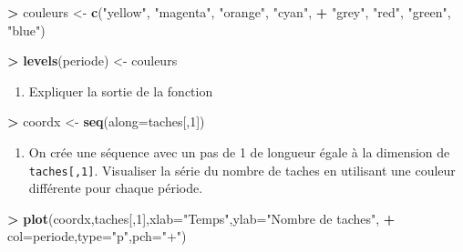 \documentclass[]{book}
\newenvironment{Shaded}{\begin{snugshade}}{\end{snugshade}}
\newcommand{\DataTypeTok}[1]{\textcolor[rgb]{0.13,0.29,0.53}{#1}}
\newcommand{\DecValTok}[1]{\textcolor[rgb]{0.00,0.00,0.81}{#1}}
\newcommand{\KeywordTok}[1]{\textcolor[rgb]{0.13,0.29,0.53}{\textbf{#1}}}
\newcommand{\NormalTok}[1]{#1}
\newcommand{\OperatorTok}[1]{\textcolor[rgb]{0.81,0.36,0.00}{\textbf{#1}}}
\newcommand{\StringTok}[1]{\textcolor[rgb]{0.31,0.60,0.02}{#1}}
\providecommand{\tightlist}{%
  \setlength{\itemsep}{0pt}\setlength{\parskip}{0pt}}
\theoremstyle{definition}
\theoremstyle{definition}
\theoremstyle{definition}
\theoremstyle{remark}
\begin{document}
\begin{Shaded}
\begin{Highlighting}[]
\OperatorTok{>}\StringTok{ }\NormalTok{couleurs <-}\StringTok{ }\KeywordTok{c}\NormalTok{(}\StringTok{"yellow"}\NormalTok{, }\StringTok{"magenta"}\NormalTok{, }\StringTok{"orange"}\NormalTok{, }\StringTok{"cyan"}\NormalTok{,}
\OperatorTok{+}\StringTok{               "grey"}\NormalTok{, }\StringTok{"red"}\NormalTok{, }\StringTok{"green"}\NormalTok{, }\StringTok{"blue"}\NormalTok{)}
\end{Highlighting}
\end{Shaded}

\begin{Shaded}
\begin{Highlighting}[]
\OperatorTok{>}\StringTok{ }\KeywordTok{levels}\NormalTok{(periode) <-}\StringTok{ }\NormalTok{couleurs}
\end{Highlighting}
\end{Shaded}

\begin{enumerate}
\def\labelenumi{\arabic{enumi}.}
\setcounter{enumi}{3}
\tightlist
\item
  Expliquer la sortie de la fonction
\end{enumerate}

\begin{Shaded}
\begin{Highlighting}[]
\OperatorTok{>}\StringTok{ }\NormalTok{coordx <-}\StringTok{ }\KeywordTok{seq}\NormalTok{(}\DataTypeTok{along=}\NormalTok{taches[,}\DecValTok{1}\NormalTok{])}
\end{Highlighting}
\end{Shaded}

\begin{enumerate}
\def\labelenumi{\arabic{enumi}.}
\setcounter{enumi}{4}
\tightlist
\item
  On crée une séquence avec un pas de 1 de longueur égale à la dimension de \texttt{taches{[},1{]}}. Visualiser la série du nombre de taches en utilisant une couleur différente pour chaque période.
\end{enumerate}

\begin{Shaded}
\begin{Highlighting}[]
\OperatorTok{>}\StringTok{ }\KeywordTok{plot}\NormalTok{(coordx,taches[,}\DecValTok{1}\NormalTok{],}\DataTypeTok{xlab=}\StringTok{"Temps"}\NormalTok{,}\DataTypeTok{ylab=}\StringTok{"Nombre de taches"}\NormalTok{,}
\OperatorTok{+}\StringTok{      }\DataTypeTok{col=}\NormalTok{periode,}\DataTypeTok{type=}\StringTok{"p"}\NormalTok{,}\DataTypeTok{pch=}\StringTok{"+"}\NormalTok{)}
\end{Highlighting}
\end{Shaded}
\end{document}

